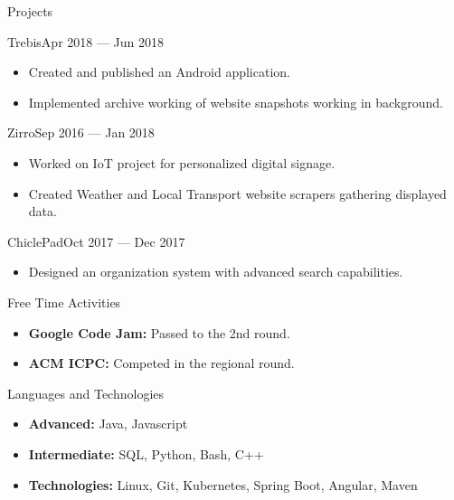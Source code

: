 \documentclass[]{style}
\begin{document}
	\begin{cvsection}{Projects}
	    \begin{cvsubsection}{Trebis}{}{Apr 2018 — Jun 2018}
			\begin{itemize}
				\item Created and published an Android application.
				\item Implemented archive working of website snapshots working in background.
			\end{itemize}
		\end{cvsubsection}
		
		\begin{cvsubsection}{Zirro}{}{Sep 2016 — Jan 2018}
			\begin{itemize}
			    	\item Worked on IoT project for personalized digital signage.
				\item Created Weather and Local Transport website scrapers gathering displayed data.
			\end{itemize}
		\end{cvsubsection}
		
	    \begin{cvsubsection}{ChiclePad}{}{Oct 2017 — Dec 2017}
			\begin{itemize}
				\item Designed an organization system with advanced search capabilities.
			\end{itemize}
		\end{cvsubsection}
	\end{cvsection}
	
	\begin{cvsection}{Free Time Activities}
		\begin{cvsubsection}{}{}{}	
			\begin{itemize}
				\item \textbf{Google Code Jam:} Passed to the 2nd round.
				\item \textbf{ACM ICPC:} Competed in the regional round.
			\end{itemize}
		\end{cvsubsection}
	\end{cvsection}
	
	\begin{cvsection}{Languages and Technologies}
		\begin{cvsubsection}{}{}{}	
			\begin{itemize}
				\item \textbf{Advanced:} Java, Javascript
				\item \textbf{Intermediate:} SQL, Python, Bash, C++
				\item \textbf{Technologies:} Linux, Git, Kubernetes, Spring Boot, Angular, Maven
			\end{itemize}
		\end{cvsubsection}
	\end{cvsection}
	
\end{document}
